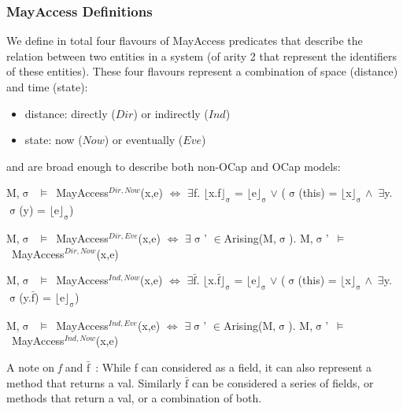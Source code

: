 \documentclass[a4paper,11pt, twoside,twocolumn]{article}
\newenvironment{logic}[1][]
{\begin{flushleft} \small }
{\end{flushleft}}
\newcommand{\loin}{$\in$}
\newcommand{\loexists}{$\exists$}
\newcommand{\loand}{$\land$}
\newcommand{\loor} {$\lor$}
\newcommand{\losigma}{$\upsigma$}
\newcommand{\loturns} {$\vDash$}
\newcommand{\loiff} {$\iff$}
\newcommand{\loexec}[2] {$\lfloor$#1$\rfloor _{\text{#2}}$}
\newcommand{\loconj}[1] {$\bar{\text{#1}}$}
\newcommand{\ablock} {\null\qquad}
\begin{document}
\subsubsection{MayAccess Definitions}
We define in total four flavours of MayAccess predicates that describe the relation between two entities in a system (of arity 2 that represent the identifiers of these entities). These four flavours represent a combination of space (distance) and time (state):
\begin{itemize}
\item distance: directly ($Dir$) or indirectly ($Ind$)
\item state: now ($Now$) or eventually ($Eve$)
\end{itemize}
and are broad enough to describe both non-OCap and OCap models:
\begin{logic}[MayAccessDirNow]
M,\losigma\ \loturns\ MayAccess$^{Dir,Now}$(x,e) \loiff \linebreak
\ablock \loexists f. \loexec{x.f}{\losigma} = \loexec{e}{\losigma}
\loor \linebreak
\ablock (\losigma(this) = \loexec{x}{\losigma} \loand\ \loexists y. \losigma(y) = \loexec{e}{\losigma})
\end{logic}
\begin{logic}[MayAccessDirEve]
 M,\losigma\ \loturns\ MayAccess$^{Dir,Eve}$(x,e) \loiff \linebreak
\ablock \loexists \losigma' \loin Arising(M,\losigma).\linebreak
\ablock M,\losigma'\ \loturns\ MayAccess$^{Dir,Now}$(x,e) 
\end{logic}
\begin{logic}[MayAccessIndNow]
M,\losigma\ \loturns\ MayAccess$^{Ind,Now}$(x,e) \loiff \linebreak
\ablock \loexists \loconj{f}. \loexec{x.\loconj{f}}{\losigma} = \loexec{e}{\losigma}
\loor \linebreak
\ablock (\losigma(this) = \loexec{x}{\losigma} \loand\ \loexists y. \losigma(y.\loconj{f}) = \loexec{e}{\losigma})
\end{logic}
\begin{logic}[MayAccessIndEve]
M,\losigma\ \loturns\ MayAccess$^{Ind,Eve}$(x,e) \loiff \linebreak
\ablock \loexists \losigma' \loin Arising(M,\losigma).\linebreak
\ablock M,\losigma'\ \loturns\ MayAccess$^{Ind,Now}$(x,e) 
\end{logic}

A note on \textit{f} and \textit{\loconj{f}}\ : While f can considered as a field, it can also represent a method that returns a val.
Similarly \loconj{f} can be considered a series of fields, or methods that return a val, or a combination of both.\\
\end{document}
